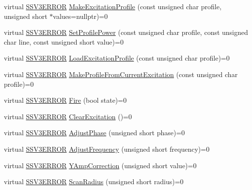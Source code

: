 \begin{DoxyCompactItemize}
\item 
virtual \hyperlink{classSSV3_1_1Controller_a8ff24a92ec373aa1257dcfe2aa2e5406}{S\+S\+V3\+E\+R\+R\+OR} \hyperlink{classSSV3_1_1Controller_ab487017fe12dd264eb13ed5a22ea5234}{Make\+Excitation\+Profile} (const unsigned char profile, unsigned short $\ast$values=nullptr)=0
\item 
virtual \hyperlink{classSSV3_1_1Controller_a8ff24a92ec373aa1257dcfe2aa2e5406}{S\+S\+V3\+E\+R\+R\+OR} \hyperlink{classSSV3_1_1Controller_a86dec212a202c8fae4eed2ab5251075d}{Set\+Profile\+Power} (const unsigned char profile, const unsigned char line, const unsigned short value)=0
\item 
virtual \hyperlink{classSSV3_1_1Controller_a8ff24a92ec373aa1257dcfe2aa2e5406}{S\+S\+V3\+E\+R\+R\+OR} \hyperlink{classSSV3_1_1Controller_a556fcce5eaf8e0858b5eb05d305ec2d8}{Load\+Excitation\+Profile} (const unsigned char profile)=0
\item 
virtual \hyperlink{classSSV3_1_1Controller_a8ff24a92ec373aa1257dcfe2aa2e5406}{S\+S\+V3\+E\+R\+R\+OR} \hyperlink{classSSV3_1_1Controller_a9de63a8ca846a49c3a7d4e988f887d73}{Make\+Profile\+From\+Current\+Excitation} (const unsigned char profile)=0
\item 
virtual \hyperlink{classSSV3_1_1Controller_a8ff24a92ec373aa1257dcfe2aa2e5406}{S\+S\+V3\+E\+R\+R\+OR} \hyperlink{classSSV3_1_1Controller_a2e5dde8cc685bede99147a25bc8f70a8}{Fire} (bool state)=0
\item 
virtual \hyperlink{classSSV3_1_1Controller_a8ff24a92ec373aa1257dcfe2aa2e5406}{S\+S\+V3\+E\+R\+R\+OR} \hyperlink{classSSV3_1_1Controller_aeb92ffd0489932c59f7cf8454b9141b2}{Clear\+Excitation} ()=0
\item 
virtual \hyperlink{classSSV3_1_1Controller_a8ff24a92ec373aa1257dcfe2aa2e5406}{S\+S\+V3\+E\+R\+R\+OR} \hyperlink{classSSV3_1_1Controller_a467ae341e71de80ab18bb5c0a8ed8f4f}{Adjust\+Phase} (unsigned short phase)=0
\item 
virtual \hyperlink{classSSV3_1_1Controller_a8ff24a92ec373aa1257dcfe2aa2e5406}{S\+S\+V3\+E\+R\+R\+OR} \hyperlink{classSSV3_1_1Controller_a752ede3242af22ba7ccc1a332c65f195}{Adjust\+Frequency} (unsigned short frequency)=0
\item 
virtual \hyperlink{classSSV3_1_1Controller_a8ff24a92ec373aa1257dcfe2aa2e5406}{S\+S\+V3\+E\+R\+R\+OR} \hyperlink{classSSV3_1_1Controller_af3db85c32975f6756e03bb2d8a21ca45}{Y\+Amp\+Correction} (unsigned short value)=0
\item 
virtual \hyperlink{classSSV3_1_1Controller_a8ff24a92ec373aa1257dcfe2aa2e5406}{S\+S\+V3\+E\+R\+R\+OR} \hyperlink{classSSV3_1_1Controller_a9b01383dc0fde626988c9c08e10bd537}{Scan\+Radius} (unsigned short radius)=0

\end{DoxyCompactItemize}

